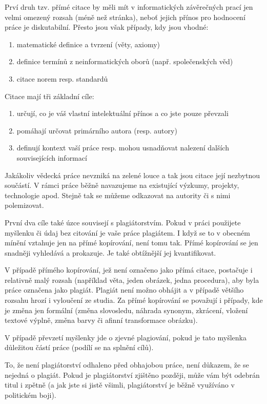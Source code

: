 \documentclass[male,czech,api_bc]{kitheses}
\begin{document}
Prví druh tzv. přímé citace by měli mít v informatických závěrečných prací jen velmi omezený rozsah (méně než stránka), neboť jejich přínos pro hodnocení práce je diskutabilní. Přesto jsou však případy, kdy jsou vhodné:

\begin{enumerate}
\item matematické definice a tvrzení (věty, axiomy)
\item definice termínů z neinformatických oborů (např. společenských věd)
\item citace norem resp. standardů
\end{enumerate} 

Citace mají tři základní cíle:
\begin{enumerate}
\item určují, co je váš vlastní intelektuální přínos a co jste pouze převzali
\item pomáhají určovat primárního autora (resp. autory)
\item definují kontext vaší práce resp. mohou usnadňovat nalezení dalších souvisejících informací
\end{enumerate}

Jakákoliv vědecká práce nevzniká na zelené louce a tak jsou citace její nezbytnou součástí. V rámci práce běžně navazujeme na existující výzkumy, projekty, technologie apod. Stejně tak se můžeme odkazovat na autority či s nimi polemizovat.

První dva cíle také úzce souvisejí s plagiátorstvím. Pokud v práci použijete myšlenku či údaj bez citování je vaše práce plagiátem. I když se to v obecném mínění vztahuje jen na přímé kopírování, není tomu tak. Přímé kopírování se jen snadněji vyhledává a prokazuje. Je také obtížnější jej kvantifikovat.

V případě přímého kopírování, jež není označeno jako přímá citace, postačuje i relativně malý rozsah (například věta, jeden obrázek, jedna procedura), aby byla práce označena jako plagiát. Plagiát není možno obhájit a v případě většího rozsahu hrozí i vyloučení ze studia. Za přímé kopírování se považují i případy, kde je změna jen formální (změna slovosledu, náhrada synonym, zkrácení, vložení textové výplně, změna barvy či afinní transformace obrázku).

V případě převzetí myšlenky jde o zjevné plagiování, pokud je tato myšlenka důležitou částí práce (podílí se na splnění cílů). 

To, že není plagiátorství odhaleno před obhajobou práce, není důkazem, že se nejedná o plagiát. Pokud je plagiátorství zjištěno později, může vám být odebrán titul i zpětně (a jak jste si jistě všimli, plagiátorství je běžně využíváno v politickém boji).
\end{document}
